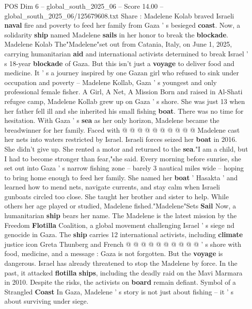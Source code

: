 \begin{textsample}{POS Dim 6 – global\_south\_2025\_06 – Score 14.00 – global\_south\_2025\_06/125679608.txt}  \label{ex:f6_pos_016}
Share : Madelene Kolab braved Israeli \textbf{naval} fire and poverty to feed her family from Gaza ' s besieged \textbf{coast}.
Now, a solidarity \textbf{ship} named Madelene \textbf{sails} in her honor to break the \textbf{blockade}.
Madelene Kolab The"Madelene"set out from Catania, Italy, on June 1, 2025, carrying humanitarian \textbf{aid} and international activists determined to break Israel ' s 18-year \textbf{blockade} of Gaza.
But this isn't just a \textbf{voyage} to deliver food and medicine.
It ' s a journey inspired by one Gazan girl who refused to sink under occupation and poverty -- Madelene Kollab, Gaza ' s youngest and only professional female fisher.
A Girl, A Net, A Mission Born and raised in Al-Shati refugee camp, Madelene Kollab grew up on Gaza ' s shore.
She was just 13 when her father fell ill and she inherited his small fishing \textbf{boat}.
There was no time for hesitation.
With Gaza ' s \textbf{sea} as her only horizon, Madelene became the breadwinner for her family.
Faced with @ @ @ @ @ @ @ @ @ @ Madelene cast her nets into waters restricted by Israel.
Israeli forces seized her \textbf{boat} in 2016.
She didn't give up.
She rented a motor and returned to the \textbf{sea}."I am a child, but I had to become stronger than fear,"she said.
Every morning before sunrise, she set out into Gaza ' s narrow fishing zone -- barely 3 nautical miles wide -- hoping to bring home enough to feed her family.
She named her \textbf{boat} ' Hasakta ' and learned how to mend nets, navigate currents, and stay calm when Israeli gunboats circled too close.
She taught her brother and sister to help.
While others her age played or studied, Madelene fished."Madelene"Sets \textbf{Sail} Now, a humanitarian \textbf{ship} bears her name.
The Madelene is the latest mission by the Freedom \textbf{Flotilla} Coalition, a global movement challenging Israel ' s siege nd genocide in Gaza.
The \textbf{ship} carries 12 international activists, including \textbf{climate} justice icon Greta Thunberg and French @ @ @ @ @ @ @ @ @ @ ' s shore with food, medicine, and a message : Gaza is not forgotten.
But the \textbf{voyage} is dangerous.
Israel has already threatened to stop the Madelene by force.
In the past, it attacked \textbf{flotilla} \textbf{ships}, including the deadly raid on the Mavi Marmara in 2010.
Despite the risks, the activists on \textbf{board} remain defiant.
Symbol of a Strangled \textbf{Coast} In Gaza, Madelene ' s story is not just about fishing -- it ' s about surviving under siege.

\end{textsample}
